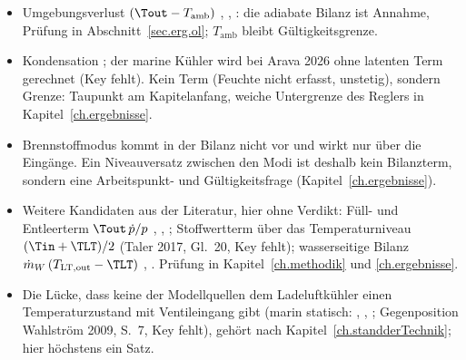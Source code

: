 \begin{itemize}
  \item Umgebungsverlust $(\Tout - T_{\mathrm{amb}})$
    \cite[Gl.~27 und 34]{ariciVehicleEngineCooling1999},
    \cite[Gl.~31.13]{almbauerThermomanagement2019},
    \cite[Gl.~10]{vagapovDynamicModelTemperature2022}: die adiabate Bilanz ist
    Annahme, Prüfung in Abschnitt~\ref{sec.erg.ol}; $T_{\mathrm{amb}}$ bleibt
    Gültigkeitsgrenze.
  \item Kondensation
    \cite[Abschn.~12.4, S.~265--268]{pucherLadeluftkuehlungUndLadeluftkuehler2012};
    der marine Kühler wird bei Arava 2026 ohne latenten Term gerechnet (Key
    fehlt). Kein Term (Feuchte nicht erfasst, unstetig), sondern Grenze:
    Taupunkt am Kapitelanfang, weiche Untergrenze des Reglers in
    Kapitel~\ref{ch.ergebnisse}.
  \item Brennstoffmodus kommt in der Bilanz nicht vor und wirkt nur über die
    Eingänge. Ein Niveauversatz zwischen den Modi ist deshalb kein Bilanzterm,
    sondern eine Arbeitspunkt- und Gültigkeitsfrage
    (Kapitel~\ref{ch.ergebnisse}).
  \item Weitere Kandidaten aus der Literatur, hier ohne Verdikt: Füll- und
    Entleerterm $\Tout\,\dot p/p$
    \cite[Gl.~7.26a]{erikssonModelingControlEngines2014},
    \cite[Gl.~30]{theotokatosCycleMeanValue2010},
    \cite[Gl.~20.26]{merkerThermodynamischeGrundlagen2019}; Stoffwertterm über
    das Temperaturniveau $(\Tin + \TLT)/2$
    \cite[Gl.~7.70]{erikssonModelingControlEngines2014} (Taler 2017, Gl.~20,
    Key fehlt); wasserseitige Bilanz $\dot m_W\,(T_{\mathrm{LT,out}} - \TLT)$
    \cite[S.~96, Gl.~2.170 und 2.171]{guzzellaIntroductionModelingControl2010},
    \cite[Gl.~4.7.36]{isermannEngineModelingControl2014}. Prüfung in
    Kapitel~\ref{ch.methodik} und \ref{ch.ergebnisse}.
  \item Die Lücke, dass keine der Modellquellen dem Ladeluftkühler einen
    Temperaturzustand mit Ventileingang gibt (marin statisch:
    \cite{theotokatosCycleMeanValue2010}, \cite{baldiDevelopmentCombinedMean2015},
    \cite{suiMeanValueFirst2022}; Gegenposition Wahlström 2009, S.~7, Key
    fehlt), gehört nach Kapitel~\ref{ch.standderTechnik}; hier höchstens ein
    Satz.
\end{itemize}


